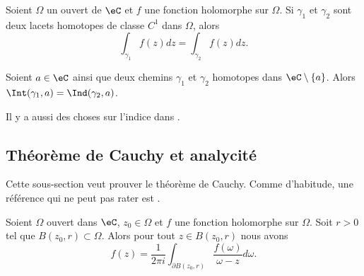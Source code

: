 \begin{theorem}
	Soient \( \Omega\) un ouvert de \( \eC\) et \( f\) une fonction holomorphe sur \( \Omega\). Si \( \gamma_1\) et \( \gamma_2\) sont deux lacets homotopes de classe \( C^1\) dans \( \Omega\), alors
	\begin{equation}
		\int_{\gamma_1}f(z)dz=\int_{\gamma_2}f(z)dz.
	\end{equation}
\end{theorem}

\begin{corollary}   \label{CorGZXzuZR}
	Soient \( a\in \eC\) ainsi que deux chemins \( \gamma_1\) et \( \gamma_2\) homotopes dans \( \eC\setminus\{ a \}\). Alors \( \Int(\gamma_1,a)=\Ind(\gamma_2,a)\).
\end{corollary}
Il y a aussi des choses sur l'indice dans \cite{Holomorphieus}.


\subsection{Théorème de Cauchy et analycité}

Cette sous-section veut prouver le théorème de Cauchy. Comme d'habitude, une référence qui ne peut pas rater est \cite{Holomorphieus}.


\begin{theorem}    \label{ThoUHztQe}
	Soient \( \Omega\) ouvert dans \( \eC\), \( z_0\in \Omega\) et \( f\) une fonction holomorphe sur \( \Omega\). Soit \( r>0\) tel que \( B(z_0,r)\subset \Omega\). Alors pour tout \( z\in B(z_0,r)\) nous avons
	\begin{equation}    \label{EqPzUABM}
		f(z)=\frac{1}{ 2\pi i }\int_{\partial B(z_0,r)}\frac{ f(\omega) }{ \omega-z }d\omega.
	\end{equation}
\end{theorem}

